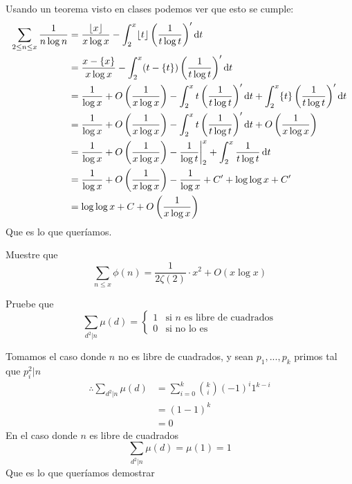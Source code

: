 \begin{sol}
    Usando un teorema visto en clases podemos ver que esto se cumple:
    \begin{align*}
        \sum_{2\leq n\leq x}\frac{1}{n\log n}&=\frac{\lfloor x\rfloor}{x\log x}-\int_2^x\lfloor t\rfloor \left(\frac{1}{t\log t}\right)'\operatorname{d}\!{t}\\
        &=\frac{x-\{x\}}{x\log x}-\int_2^x (t-\{t\}) \left(\frac{1}{t\log t}\right)'\operatorname{d}\!{t}\\
        &=\frac{1}{\log x}+O\left(\frac{1}{x\log x}\right)-\int_2^x t \left(\frac{1}{t\log t}\right)'\operatorname{d}\!{t}+\int_2^x \{t\}\left(\frac{1}{t\log t}\right)'\operatorname{d}\!{t}\\
        &=\frac{1}{\log x}+O\left(\frac{1}{x\log x}\right)-\int_2^x t \left(\frac{1}{t\log t}\right)'\operatorname{d}\!{t}+O\left(\frac{1}{x\log x}\right)\\
        &=\frac{1}{\log x}+O\left(\frac{1}{x\log x}\right)-\frac{1}{\log t}\bigg\rvert_2^x+\int_2^x \frac{1}{t\log t}\operatorname{d}\!{t}\\
        &=\frac{1}{\log x}+O\left(\frac{1}{x\log x}\right)-\frac{1}{\log x}+C'+\log\log x+C'\\
        &=\log\log x+C+O\left(\frac{1}{x\log x}\right)
    \end{align*}
    Que es lo que queríamos.
\end{sol}

\begin{prob}
	Muestre que
	\[\sum_{n\leq x}\phi(n)=\frac{1}{2\zeta(2)}\cdot x^2+O(x\log x)\]
\end{prob}

\begin{sol}

\end{sol}

\begin{prob}
	Pruebe que
	\[\sum_{d^2|n}\mu(d)=\begin{cases}
			1 & \text{si $n$ es libre de cuadrados} \\
			0 & \text{si no lo es}
		\end{cases}\]
\end{prob}

\begin{sol}
    Tomamos el caso donde $n$ no es libre de cuadrados, y sean $p_1,...,p_k$ primos tal que $p_i^2|n$
    \begin{align*}
        \therefore\sum_{d^2|n}\mu(d)&=\sum_{i=0}^k\binom{k}{i}(-1)^i1^{k-i}\\
        &=(1-1)^k\\
        &=0
    \end{align*}
    En el caso donde $n$ es libre de cuadrados
    \[\sum_{d^2|n}\mu(d)=\mu(1)=1\]
    Que es lo que queríamos demostrar
\end{sol}


